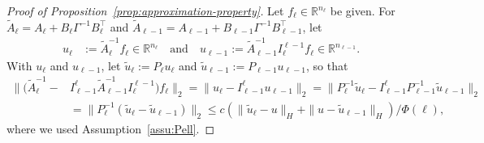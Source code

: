 \documentclass[10pt,a4paper]{amsart}
\begin{document}
\begin{proof}[Proof of Proposition~\ref{prop:approximation-property}]
	Let $f_{\ell}\in\mathbb{R}^{n_{\ell}}$ be given. For
	$\widetilde{A}_{\ell}=A_{\ell}+B_{\ell}\Gamma^{-1}B_{\ell}^{\top}$ and
	$\widetilde{A}_{\ell-1}=A_{\ell-1}+B_{\ell-1}\Gamma^{-1}B_{\ell-1}^{\top}$, let
	\begin{align*}
		u_{\ell} & :=\widetilde{A}_{\ell}^{-1}f_{\ell}\in\mathbb{R}^{n_{\ell}}
		\quad\text{and}\quad
		u_{\ell-1}:=\widetilde{A}_{\ell-1}^{-1}I_{\ell}^{\ell-1}f_{\ell}\in\mathbb{R}^{n_{\ell-1}}.
	\end{align*}
	With $u_{\ell}$ and $u_{\ell-1}$, let $\tilde{u}_{\ell}:=P_{\ell}u_{\ell}$
	and $\tilde{u}_{\ell-1}:=P_{\ell-1}u_{\ell-1}$, so that
	\begin{align}
		\|(\widetilde{A}_{\ell}^{-1}- & I_{\ell-1}^{\ell}\widetilde{A}_{\ell-1}^{-1}I_{\ell}^{\ell-1})f_{\ell}\|_{2}  =\|u_{\ell}-I_{\ell-1}^{\ell}u_{\ell-1}\|_{2} =\|P_{\ell}^{-1}\tilde{u}_{\ell}-I_{\ell-1}^{\ell}P_{\ell-1}^{-1}\tilde{u}_{\ell-1}\|_{2} \\
		                              & =\|P_{\ell}^{-1}(\tilde{u}_{\ell}-\tilde{u}_{\ell-1})\|_{2}
		\leq c(\|\tilde{u}_{\ell}-u\|_{H}+\|u-\tilde{u}_{\ell-1}\|_{H})/\Phi(\ell),\label{eq:diff-in-uell-uellminus1}
	\end{align}
	where we used Assumption~\ref{assu:Pell}.


\end{proof}
\end{document}
